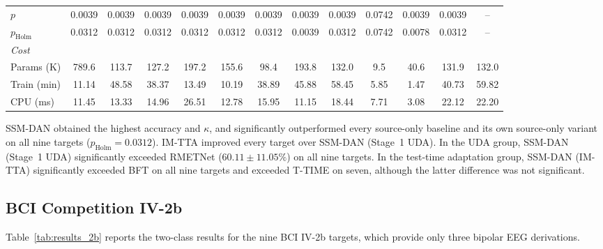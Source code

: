 \documentclass[preprint,12pt]{elsarticle}
\begin{document}
\begin{table}
\begin{adjustbox}{max width=\dimexpr\textheight+80pt\relax}
\begin{tabular}{l@{\hspace{6pt}}cccccc@{\hspace{6pt}}cc@{\hspace{6pt}}ccc@{\hspace{6pt}}c}
\midrule
$p$ & 0.0039 & 0.0039 & 0.0039 & 0.0039 & 0.0039 & 0.0039 & 0.0039 & 0.0039 & 0.0742 & 0.0039 & 0.0039 & -- \\
$p_\mathrm{Holm}$ & 0.0312 & 0.0312 & 0.0312 & 0.0312 & 0.0312 & 0.0312 & 0.0039 & 0.0312 & 0.0742 & 0.0078 & 0.0312 & -- \\
\midrule
\multicolumn{13}{l}{\textit{Cost}} \\
Params (K) & 789.6 & 113.7 & 127.2 & 197.2 & 155.6 & 98.4 & 193.8 & 132.0 & 9.5 & 40.6 & 131.9 & 132.0 \\
Train (min) & 11.14 & 48.58 & 38.37 & 13.49 & 10.19 & 38.89 & 45.88 & 58.45 & 5.85 & 1.47 & 40.73 & 59.82 \\
CPU (ms) & 11.45 & 13.33 & 14.96 & 26.51 & 12.78 & 15.95 & 11.15 & 18.44 & 7.71 & 3.08 & 22.12 & 22.20 \\
\bottomrule
\end{tabular}
\end{adjustbox}
\end{table}

SSM-DAN obtained the highest accuracy and $\kappa$, and significantly outperformed every source-only baseline and its own source-only variant on all nine targets ($p_\mathrm{Holm}=0.0312$). IM-TTA improved every target over SSM-DAN (Stage~1 UDA). In the UDA group, SSM-DAN (Stage~1 UDA) significantly exceeded RMETNet ($60.11\pm11.05\%$) on all nine targets. In the test-time adaptation group, SSM-DAN (IM-TTA) significantly exceeded BFT on all nine targets and exceeded T-TIME on seven, although the latter difference was not significant.


\subsection{BCI Competition IV-2b}
\label{subsec:results_2b}

Table~\ref{tab:results_2b} reports the two-class results for the nine BCI IV-2b targets, which provide only three bipolar EEG derivations.
\end{document}

